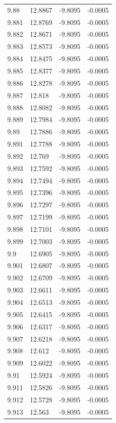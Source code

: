 \begin{tabular}{llll}
9.88 & 12.8867 & -9.8095 & -0.0005 \\
9.881 & 12.8769 & -9.8095 & -0.0005 \\
9.882 & 12.8671 & -9.8095 & -0.0005 \\
9.883 & 12.8573 & -9.8095 & -0.0005 \\
9.884 & 12.8475 & -9.8095 & -0.0005 \\
9.885 & 12.8377 & -9.8095 & -0.0005 \\
9.886 & 12.8278 & -9.8095 & -0.0005 \\
9.887 & 12.818 & -9.8095 & -0.0005 \\
9.888 & 12.8082 & -9.8095 & -0.0005 \\
9.889 & 12.7984 & -9.8095 & -0.0005 \\
9.89 & 12.7886 & -9.8095 & -0.0005 \\
9.891 & 12.7788 & -9.8095 & -0.0005 \\
9.892 & 12.769 & -9.8095 & -0.0005 \\
9.893 & 12.7592 & -9.8095 & -0.0005 \\
9.894 & 12.7494 & -9.8095 & -0.0005 \\
9.895 & 12.7396 & -9.8095 & -0.0005 \\
9.896 & 12.7297 & -9.8095 & -0.0005 \\
9.897 & 12.7199 & -9.8095 & -0.0005 \\
9.898 & 12.7101 & -9.8095 & -0.0005 \\
9.899 & 12.7003 & -9.8095 & -0.0005 \\
9.9 & 12.6905 & -9.8095 & -0.0005 \\
9.901 & 12.6807 & -9.8095 & -0.0005 \\
9.902 & 12.6709 & -9.8095 & -0.0005 \\
9.903 & 12.6611 & -9.8095 & -0.0005 \\
9.904 & 12.6513 & -9.8095 & -0.0005 \\
9.905 & 12.6415 & -9.8095 & -0.0005 \\
9.906 & 12.6317 & -9.8095 & -0.0005 \\
9.907 & 12.6218 & -9.8095 & -0.0005 \\
9.908 & 12.612 & -9.8095 & -0.0005 \\
9.909 & 12.6022 & -9.8095 & -0.0005 \\
9.91 & 12.5924 & -9.8095 & -0.0005 \\
9.911 & 12.5826 & -9.8095 & -0.0005 \\
9.912 & 12.5728 & -9.8095 & -0.0005 \\
9.913 & 12.563 & -9.8095 & -0.0005 \\

\end{tabular}
